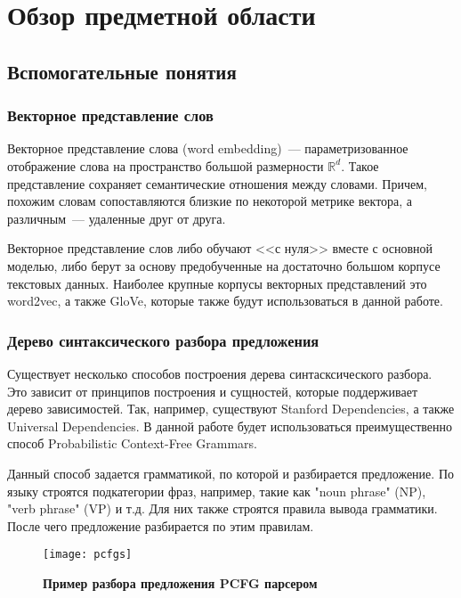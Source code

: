 
\startrelatedwork

\chapter{Обзор предметной области}

\section{Вспомогательные понятия}

\subsection{Векторное представление слов}
Векторное представление слова (word embedding)\cite{Bengio03aneural}~--- параметризованное отображение слова на пространство большой размерности $\mathbb{R}^d$. 
Такое представление сохраняет семантические отношения между словами. 
Причем, похожим словам сопоставляются близкие по некоторой метрике вектора, 
а различным~--- удаленные друг от друга.

Векторное представление слов либо обучают <<с нуля>> вместе с основной моделью, либо берут за основу предобученные на достаточно большом корпусе текстовых данных. Наиболее крупные корпусы векторных представлений это word2vec\cite{DBLP:journals/corr/MikolovLS13, wor2vec}, а также GloVe\cite{pennington2014glove, glove}, которые также будут использоваться в данной работе.

\subsection{Дерево синтаксического разбора предложения}
Существует несколько способов построения дерева синтасксического разбора.
Это зависит от принципов построения и сущностей, которые поддерживает дерево зависимостей.
Так, например, существуют Stanford Dependencies\cite{standeps}, а также Universal Dependencies\cite{unideps}.
В данной работе будет использоваться преимущественно способ Probabilistic Context-Free Grammars\cite{pcfg}.

Данный способ задается грамматикой, по которой и разбирается предложение\cite{Klein03accurateunlexicalized}.
По языку строятся подкатегории фраз, например, такие как "noun phrase" (NP), "verb phrase" (VP) и т.д. 
Для них также строятся правила вывода грамматики. После чего предложение разбирается по этим правилам. 

\begin{figure}[h]
\texttt{[image: pcfgs]}
\caption{\textbf{Пример разбора предложения PCFG парсером}}
\label{fig:pcfgs}
\end{figure}


